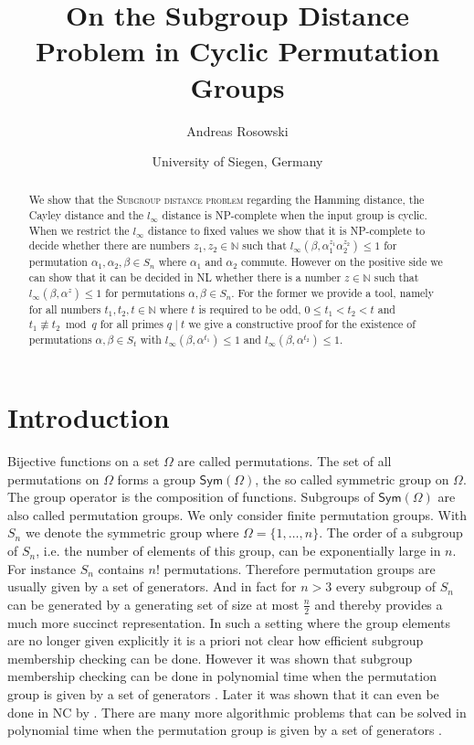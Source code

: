 \documentclass{article}
\begin{document}
\title{On the Subgroup Distance Problem in Cyclic Permutation Groups}

\author{
  Andreas Rosowski\\
}
\date{
University of Siegen, Germany
}

\maketitle
\begin{abstract}
We show that the \textsc{Subgroup distance problem} regarding the Hamming distance, the Cayley distance and the $l_\infty$ distance is {\sf NP}-complete when the input group is cyclic. When we restrict the $l_\infty$ distance to fixed values we show that it is {\sf NP}-complete to decide whether there are numbers $z_1,z_2 \in \mathbb{N}$ such that $l_\infty(\beta, \alpha_1^{z_1}\alpha_2^{z_2}) \leq 1$ for permutation $\alpha_1,\alpha_2,\beta \in S_n$ where $\alpha_1$ and $\alpha_2$ commute. However on the positive side we can show that it can be decided in {\sf NL} whether there is a number $z \in \mathbb{N}$ such that $l_\infty(\beta, \alpha^z) \leq 1$ for permutations $\alpha,\beta \in S_n$. For the former we provide a tool, namely for all numbers $t_1,t_2,t \in \mathbb{N}$ where $t$ is required to be odd, $0 \leq t_1 < t_2 < t$ and $t_1 \not\equiv t_2 \bmod q$ for all primes $q \mid t$ we give a constructive proof for the existence of permutations $\alpha,\beta \in S_t$ with $l_\infty(\beta, \alpha^{t_1}) \leq 1$ and $l_\infty(\beta, \alpha^{t_2}) \leq 1$.
\end{abstract}

\section{Introduction}
Bijective functions on a set $\Omega$ are called permutations. The set of all permutations on $\Omega$ forms a group $\mathsf{Sym}(\Omega)$, the so called symmetric group on $\Omega$. The group operator is the composition of functions. Subgroups of $\mathsf{Sym}(\Omega)$ are also called permutation groups. We only consider finite permutation groups. With $S_n$ we denote the symmetric group where $\Omega = \{1,\dots,n\}$. The order of a subgroup of $S_n$, i.e. the number of elements of this group, can be exponentially large in $n$. For instance $S_n$ contains $n!$ permutations. Therefore permutation groups are usually given by a set of generators. And in fact for $n > 3$ every subgroup of $S_n$ can be generated by a generating set of size at most $\frac{n}{2}$ \cite{lucchini} and thereby provides a much more succinct representation. In such a setting where the group elements are no longer given explicitly it is a priori not clear how efficient subgroup membership checking can be done. However it was shown that subgroup membership checking can be done in polynomial time when the permutation group is given by a set of generators \cite{furst,sims}. Later it was shown that it can even be done in {\sf NC} by \cite{babai}. There are many more algorithmic problems that can be solved in polynomial time when the permutation group is given by a set of generators \cite[Chapter~3]{seress}.
\end{document}
